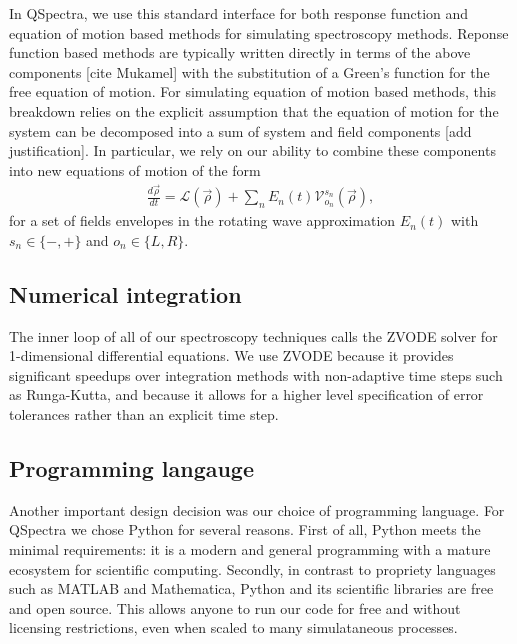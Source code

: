 \documentclass{article}
\begin{document}
In QSpectra, we use this standard interface for both response function and equation of motion based methods for simulating spectroscopy methods. Reponse function based methods are typically written directly in terms of the above components [cite Mukamel] with the substitution of a Green's function for the free equation of motion. For simulating equation of motion based methods, this breakdown relies on the explicit assumption that the equation of motion for the system can be decomposed into a sum of system and field components [add justification]. In particular, we rely on our ability to combine these components into new equations of motion of the form
\begin{align}
	\frac{d\vec\rho}{dt} = \mathcal{L}(\vec\rho) + \sum_{n} E_n(t) \mathcal{V}^{s_n}_{o_n} (\vec\rho),
\end{align}
for a set of fields envelopes in the rotating wave approximation $E_n(t)$ with $s_n \in \{-, +\}$ and $o_n \in \{L, R\}$.

\subsection{Numerical integration}

The inner loop of all of our spectroscopy techniques calls the ZVODE solver for 1-dimensional differential equations. We use ZVODE because it provides significant speedups over integration methods with non-adaptive time steps such as Runga-Kutta, and because it allows for a higher level specification of error tolerances rather than an explicit time step.

\subsection{Programming langauge}

Another important design decision was our choice of programming language. For QSpectra we chose Python for several reasons. First of all, Python meets the minimal requirements: it is a modern and general programming with a mature ecosystem for scientific computing. Secondly, in contrast to propriety languages such as MATLAB and Mathematica, Python and its scientific libraries are free and open source. This allows anyone to run our code for free and without licensing restrictions, even when scaled to many simulataneous processes.
\end{document}
